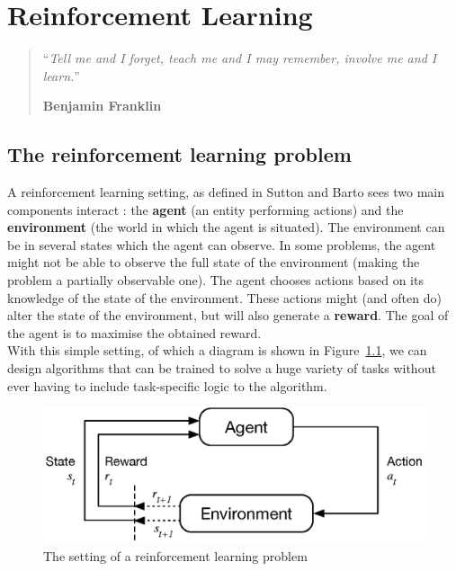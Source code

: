 \chapter{Reinforcement Learning}
\begin{quotation}
\noindent ``\emph{Tell me and I forget, teach me and I may remember, involve me
	and I learn.}''
\begin{flushright}\textbf{Benjamin Franklin}\end{flushright}
\end{quotation}

\vspace*{0.5cm}


\section{The reinforcement learning problem}
A reinforcement learning setting, as defined in Sutton and Barto \cite{suttonbarto}
sees two main components interact : the
\textbf{agent} (an entity performing actions) and the \textbf{environment}
(the world in which the agent is situated). 
The environment can be in several states which the agent
can observe. In some problems, the agent might not be able to observe the
full state of the environment (making the problem a partially observable one).  
The agent chooses actions based on its knowledge of the state of the
environment. These actions might (and often do) alter the state of the
environment, but will also generate a \textbf{reward}.  The
goal of the agent is to maximise the obtained reward.\\

With this simple setting, of which a diagram is shown in Figure~\ref{fig:rl},
we can design algorithms that can be trained to solve a huge variety of tasks
without ever having to include task-specific logic to the algorithm.\\

\begin{figure}[H]
	\centering
	\includegraphics[width=0.65\linewidth]{fig/rl.eps}
	\caption{The setting of a reinforcement learning problem 
		\cite{suttonbarto}}
	\label{fig:rl}
\end{figure}

